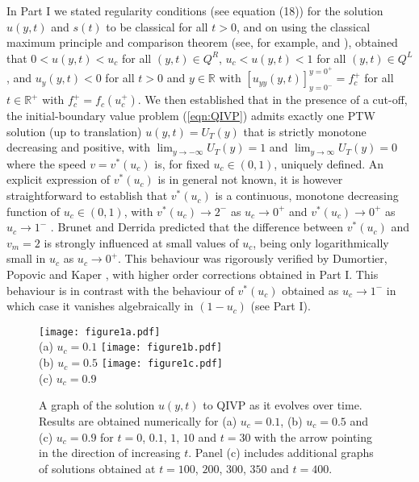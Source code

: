 \documentclass[11pt,a4paper]{article}
\newcommand{\eeref}[1]{(\ref{eqn:#1})}
\newcommand{\fflab}[1]{\label{fig:#1}}
\begin{document}
In Part I we  stated   regularity conditions  (see equation (18)) 
for the solution $u(y,t)$  and $s(t)$ to be classical for all $t>0$, and on using the classical 
	  maximum principle and comparison theorem (see, for example, \cite{AronsonSerrin1967} and \cite{Fife1979}), obtained that 
	  $0 < u(y,t) < u_c$ for all  $(y,t) \in Q^R$,   
	  $u_c < u(y,t) < 1$ for all $(y,t) \in Q^L$,
	   and  $u_y(y,t)<0$ for all $t > 0$ and $y\in\mathbb{R}$ with $[u_{yy} (y,t)]^{y = 0^+}_{y = 0^-} = f_c^+$ for all  $t \in \mathbb{R}^+$ with $f_c^+ = f_c(u_c^+)$.
%
We then established that 
in the presence of a cut-off, the initial-boundary value problem \eeref{QIVP}
admits   exactly one  PTW   solution (up to translation) $u(y,t)=U_T(y)$ 
that is   strictly monotone decreasing and positive,  
with $\lim_{y\to-\infty}U_T(y)=1$ 
and $\lim_{y\to\infty}U_T(y)=0$
where  the speed $v=v^*(u_c)$  is, 
for fixed $u_c\in(0,1)$, uniquely defined. 
An explicit expression of $v^*(u_c)$ is in general not known, it is however straightforward to establish that  $v^*(u_c)$ is a
 continuous, monotone decreasing function of $u_c\in(0,1)$, with 
$v^*(u_c)\to 2^-$ as $u_c\to 0^{+}$
and $v^*(u_c)\to 0^+$ as $u_c\to 1^{-}$  \cite{Tisbury_etal}.
Brunet and Derrida \cite{BrunetDerrida1997} predicted
that the difference between  $v^*(u_c)$ and $v_m=2$   
 is  strongly influenced at  small values of $u_c$,
being only logarithmically small in $u_c$ as 
$u_c\to 0^+$. 
This behaviour was rigorously verified by Dumortier, Popovic and Kaper
 \cite{Dumortier_etal2007}, 
 with higher order corrections obtained in Part I. This behaviour is in contrast with the behaviour of  
$v^*(u_c)$ obtained as $u_c\to 1^-$  in which case it vanishes algebraically  in $(1-u_c)$ 
(see Part I). 



   
    \begin{figure}
		 \begin{center}
 	     \texttt{[image: figure1a.pdf]}\\
		 (a) $u_c =0.1$
 	     \texttt{[image: figure1b.pdf]}\\
		 (b) $u_c =0.5$
 	     \texttt{[image: figure1c.pdf]}\\
		 (c) $u_c =0.9$
		  \end{center}
 \caption{A graph of the solution $u(y, t)$ to QIVP  as it evolves over time. Results are obtained numerically for (a) $u_c=0.1$, (b) $u_c=0.5$ and (c) $u_c=0.9$ for  $t=0$, $0.1$, $1$, $10$ and $t=30$ with the arrow pointing in the direction of increasing $t$. Panel (c) includes  additional graphs of solutions obtained at $t=100$, $200$, $300$, $350$ and $t=400$. }
  \fflab{PTWu}  
  \end{figure}
\end{document}
